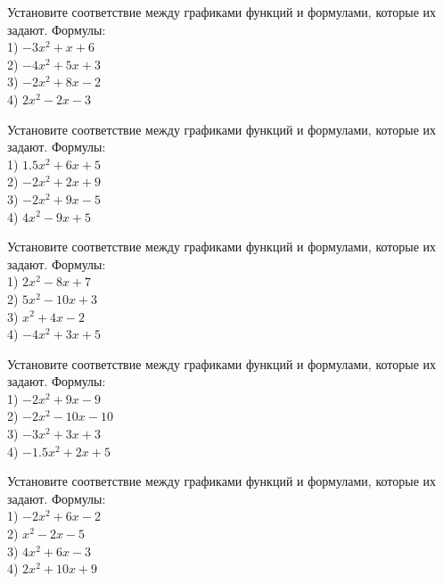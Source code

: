 \documentclass[4apaper]{article}
\begin{document}
\begin{taskBN}{88}
Установите соответствие между графиками функций и формулами, которые их задают. Формулы: \\1) $-3x^2+x+6$\\2) $-4x^2+5x+3$\\3) $-2x^2+8x-2$\\4) $2x^2-2x-3$
\end{taskBN}

\begin{taskBN}{89}
Установите соответствие между графиками функций и формулами, которые их задают. Формулы: \\1) $1.5x^2+6x+5$\\2) $-2x^2+2x+9$\\3) $-2x^2+9x-5$\\4) $4x^2-9x+5$
\end{taskBN}

\begin{taskBN}{90}
Установите соответствие между графиками функций и формулами, которые их задают. Формулы: \\1) $2x^2-8x+7$\\2) $5x^2-10x+3$\\3) $x^2+4x-2$\\4) $-4x^2+3x+5$
\end{taskBN}

\begin{taskBN}{91}
Установите соответствие между графиками функций и формулами, которые их задают. Формулы: \\1) $-2x^2+9x-9$\\2) $-2x^2-10x-10$\\3) $-3x^2+3x+3$\\4) $-1.5x^2+2x+5$
\end{taskBN}

\begin{taskBN}{92}
Установите соответствие между графиками функций и формулами, которые их задают. Формулы: \\1) $-2x^2+6x-2$\\2) $x^2-2x-5$\\3) $4x^2+6x-3$\\4) $2x^2+10x+9$
\end{taskBN}
\end{document}
